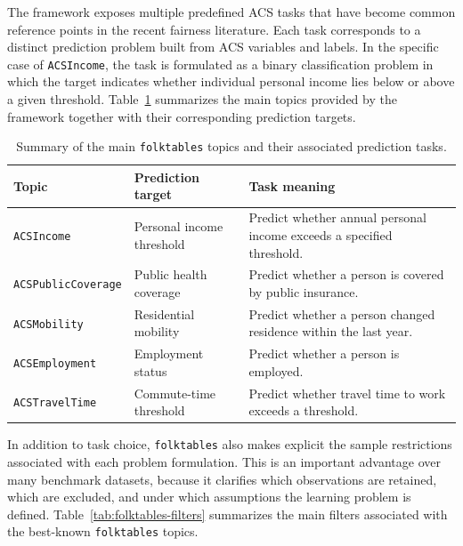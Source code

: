 The framework exposes multiple predefined ACS tasks that have become common reference points in the recent fairness literature. Each task corresponds to a distinct prediction problem built from ACS variables and labels. In the specific case of \texttt{ACSIncome}, the task is formulated as a binary classification problem in which the target indicates whether individual personal income lies below or above a given threshold. Table~\ref{tab:folktables-topics} summarizes the main topics provided by the framework together with their corresponding prediction targets.

\begin{table}[htbp]
\centering
\small
\renewcommand{\arraystretch}{1.15}
\caption{Summary of the main \texttt{folktables} topics and their associated prediction tasks.}
\label{tab:folktables-topics}
\begin{tabular}{>{\raggedright\arraybackslash}p{} p{} p{}}
  \toprule
  \textbf{Topic} & \textbf{Prediction target} & \textbf{Task meaning} \\
  \midrule
  \texttt{ACSIncome} & Personal income threshold & Predict whether annual personal income exceeds a specified threshold. \\
  \texttt{ACSPublicCoverage} & Public health coverage & Predict whether a person is covered by public insurance. \\
  \texttt{ACSMobility} & Residential mobility & Predict whether a person changed residence within the last year. \\
  \texttt{ACSEmployment} & Employment status & Predict whether a person is employed. \\
  \texttt{ACSTravelTime} & Commute-time threshold & Predict whether travel time to work exceeds a threshold. \\
  \bottomrule
\end{tabular}
\renewcommand{\arraystretch}{1.0}
\end{table}

In addition to task choice, \texttt{folktables} also makes explicit the sample restrictions associated with each problem formulation. This is an important advantage over many benchmark datasets, because it clarifies which observations are retained, which are excluded, and under which assumptions the learning problem is defined. Table~\ref{tab:folktables-filters} summarizes the main filters associated with the best-known \texttt{folktables} topics.

